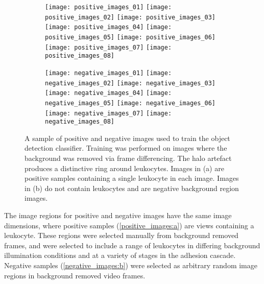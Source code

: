 \begin{figure}[htbp]{}
	\begin{subfigure}[b]{\linewidth}
		\centering
		\texttt{[image: positive\_images\_01]}
		\texttt{[image: positive\_images\_02]}
		\texttt{[image: positive\_images\_03]}
		\texttt{[image: positive\_images\_04]}
		\texttt{[image: positive\_images\_05]}
		\texttt{[image: positive\_images\_06]}
		\texttt{[image: positive\_images\_07]}
		\texttt{[image: positive\_images\_08]}
		\caption{}
		\label{positive_images:a}
	\end{subfigure}
	\begin{subfigure}[b]{\linewidth}
		\centering
		\texttt{[image: negative\_images\_01]}
		\texttt{[image: negative\_images\_02]}
		\texttt{[image: negative\_images\_03]}
		\texttt{[image: negative\_images\_04]}
		\texttt{[image: negative\_images\_05]}
		\texttt{[image: negative\_images\_06]}
		\texttt{[image: negative\_images\_07]}
		\texttt{[image: negative\_images\_08]}
		\caption{}
		\label{negative_images:b}
	\end{subfigure}
\caption[Classifier training samples]{A sample of positive and negative images used to train the object detection classifier. Training was performed on images where the background was removed via frame differencing. The halo artefact produces a distinctive ring around leukocytes. Images in (a) are positive samples containing a single leukocyte in each image. Images in (b) do not contain leukocytes and are negative background region images.}
\label{figure:classifier_samples}
\end{figure}

The image regions for positive and negative images have the same image dimensions, where positive samples (\autoref{positive_images:a}) are views containing a leukocyte. These regions were selected manually from background removed frames, and were selected to include a range of leukocytes in differing background illumination conditions and at a variety of stages in the adhesion cascade. Negative samples (\autoref{negative_images:b}) were selected as arbitrary random image regions in background removed video frames.

